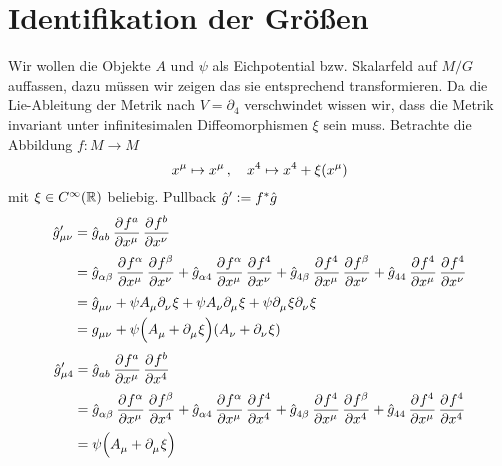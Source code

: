 \section{Identifikation der Größen}
Wir wollen die Objekte $A$ und $\psi$ als Eichpotential bzw. Skalarfeld auf
$M/G$ auffassen, dazu müssen wir zeigen das sie entsprechend transformieren.
Da die Lie-Ableitung der Metrik nach $V=\partial_4$ verschwindet wissen wir,
dass die Metrik invariant unter infinitesimalen Diffeomorphismen $\xi$ sein muss.
Betrachte die Abbildung $f:M\to M$ 
\begin{equation}
\tensor{x}{^\mu}\mapsto
\tensor{x}{^\mu}\,,\quad\tensor{x}{^4}\mapsto\tensor{x}{^4}+
\xi\left(\tensor{x}{^\mu}\right)
\end{equation}
mit $\xi\in C^\infty\left(\Reals\right)$ beliebig. 
Pullback $\hat{g}^\prime:=f^*\hat{g}$
\begin{equation}
\begin{split}
\tensor*{\fived{g}}{*^\prime_\mu_\nu}&=\tensor{\fived{g}}{_a_b}\dpd{f^a}{\tensor{x}{^\mu}}\dpd{f^b}{\tensor{x}{^\nu}}\\
&=\tensor{\fived{g}}{_\alpha_\beta}\dpd{f^\alpha}{\tensor{x}{^\mu}}\dpd{f^\beta}{\tensor{x}{^\nu}}
+\tensor{\fived{g}}{_\alpha_4}\dpd{f^\alpha}{\tensor{x}{^\mu}}\dpd{f^4}{\tensor{x}{^\nu}}
+\tensor{\fived{g}}{_4_\beta}\dpd{f^4}{\tensor{x}{^\mu}}\dpd{f^\beta}{\tensor{x}{^\nu}}
+\tensor{\fived{g}}{_4_4}\dpd{f^4}{\tensor{x}{^\mu}}\dpd{f^4}{\tensor{x}{^\nu}}
\\
&=\tensor{\fived{g}}{_\mu_\nu}
+\psi\tensor{A}{_\mu}\pdif{_\nu}\xi
+\psi\tensor{A}{_\nu}\pdif{_\mu}\xi
+\psi\pdif{_\mu}\xi\pdif{_\nu}\xi\\
&=\tensor{g}{_\mu_\nu}
+\psi\left(\tensor{A}{_\mu}+\pdif{_\mu}\xi\right)
\left(\tensor{A}{_\nu}+\pdif{_\nu}\xi\right)
\end{split}
\end{equation}
\begin{equation}
\begin{split}
\tensor*{\fived{g}}{*^\prime_\mu_4}&=\tensor{\fived{g}}{_a_b}\dpd{f^a}{\tensor{x}{^\mu}}\dpd{f^b}{\tensor{x}{^4}}\\
&=\tensor{\fived{g}}{_\alpha_\beta}\dpd{f^\alpha}{\tensor{x}{^\mu}}\dpd{f^\beta}{\tensor{x}{^4}}
+\tensor{\fived{g}}{_\alpha_4}\dpd{f^\alpha}{\tensor{x}{^\mu}}\dpd{f^4}{\tensor{x}{^4}}
+\tensor{\fived{g}}{_4_\beta}\dpd{f^4}{\tensor{x}{^\mu}}\dpd{f^\beta}{\tensor{x}{^4}}
+\tensor{\fived{g}}{_4_4}\dpd{f^4}{\tensor{x}{^\mu}}\dpd{f^4}{\tensor{x}{^4}}\\
&=\psi\left(\tensor{A}{_\mu}+\pdif{_\mu}\xi\right)
\end{split}
\end{equation}
